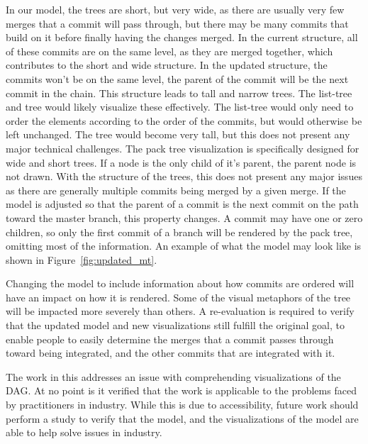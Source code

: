 In our model, the trees are short, but very wide, as there are usually
very few merges that a commit will pass through, but there may be many
commits that build on it before finally having the changes merged.
In the current structure, all of these commits are on the same level, as
they are merged together, which contributes to the short and wide
structure.
In the updated structure, the commits won't be on the same level, the
parent of the commit will be the next commit in the chain.
This structure leads to tall and narrow trees.
The list-tree and \rt{} tree would likely visualize these effectively.
The list-tree would only need to order the elements according to the
order of the commits, but would otherwise be left unchanged.
The \rt{} tree would become very tall, but this does not present any
major technical challenges.
The pack tree visualization is specifically designed for wide and short
trees.
If a node is the only child of it's parent, the parent node is not
drawn.
With the structure of the trees, this does not present any major issues
as there are generally multiple commits being merged by a given merge.
If the model is adjusted so that the parent of a commit is the next
commit on the path toward the master branch, this property changes.
A commit may have one or zero children, so only the first commit of a
branch will be rendered by the pack tree, omitting most of the
information.
An example of what the model may look like is shown in
Figure~\ref{fig:updated_mt}.

Changing the model to include information about how commits are ordered
will have an impact on how it is rendered.
Some of the visual metaphors of the tree will be impacted more severely
than others.
A re-evaluation is required to verify that the updated model and new
visualizations still fulfill the original goal, to enable people to
easily determine the merges that a commit passes through toward being
integrated, and the other commits that are integrated with it.

The work in this \paper{} addresses an issue with comprehending
visualizations of the DAG\@.
At no point is it verified that the work is applicable to the problems
faced by practitioners in industry.
While this is due to accessibility,
future work should perform a study to verify that the \mt{} model,
and the visualizations of the model are able to help solve issues in industry.
